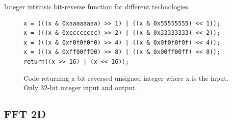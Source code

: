 \begin{table}[!htbp]
	\centering
	
	\caption{Integer intrinsic bit-reverse function for different technologies.}
	\label{tab:bit-reverse-intrinsics}
\end{table}

\begin{figure}[!htbp]
	\centering
	\lstset{language=C++}
	\begin{framed}
	\begin{lstlisting}
x = (((x & 0xaaaaaaaa) >> 1) | ((x & 0x55555555) << 1));
x = (((x & 0xcccccccc) >> 2) | ((x & 0x33333333) << 2));
x = (((x & 0xf0f0f0f0) >> 4) | ((x & 0x0f0f0f0f) << 4));
x = (((x & 0xff00ff00) >> 8) | ((x & 0x00ff00ff) << 8));
return((x >> 16) | (x << 16));
	\end{lstlisting}
	\end{framed}
	\caption{ Code returning a bit reversed unsigned integer where x is the input. Only 32-bit integer input and output. }
	\label{fig:code-bit-reverse}
\end{figure}

\subsection{FFT 2D}

